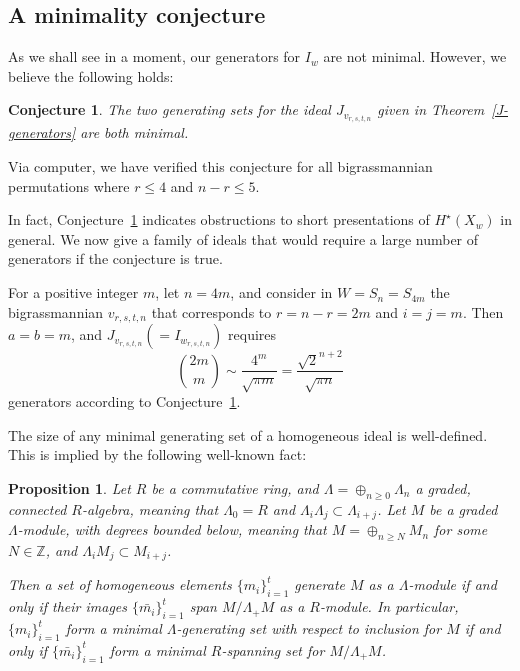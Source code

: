 \documentclass[12pt,dvips]{amsart}
\theoremstyle{plain}
\newtheorem{proposition}[theorem]{Proposition}
\newtheorem{conjecture}[theorem]{Conjecture}
\theoremstyle{definition}
\theoremstyle{remark}
\numberwithin{equation}{section}
\def\ZZ{{\mathbb Z}}
\begin{document}
\subsection{A minimality conjecture}
\label{minconj}
As we shall see in a moment, 
our generators for $I_w$ are not minimal. However,
we believe the following holds:

\begin{conjecture}
\label{minimality-conjecture}
The two generating sets for the ideal $J_{v_{r,s,t,n}}$ given in Theorem~\ref{J-generators}
are both minimal. 
\end{conjecture}

Via computer, we have verified this conjecture for all bigrassmannian permutations
where $r\leq 4$ and $n-r\leq 5$.

In fact, Conjecture~\ref{minimality-conjecture} indicates obstructions to short presentations of
$H^{\star}(X_w)$ in general. We now give 
a family of ideals that would require a large number of generators if the conjecture is true.

For a positive integer $m$, let $n=4m$, and consider in
$W=S_n=S_{4m}$ the bigrassmannian $v_{r,s,t,n}$ that corresponds
to $r=n-r=2m$ and $i=j=m$.  Then $a=b=m$, and $J_{v_{r,s,t,n}}(=I_{w_{r,s,t,n}})$ requires 
\begin{equation}
\label{eqn:badlowerbnd}
\binom{2m}{m} \sim \frac{4^m}{\sqrt{\pi m}} = \frac{\sqrt{2}^{n+2}}{\sqrt{\pi n}}
\end{equation}
generators according to Conjecture~\ref{minimality-conjecture}. 

The size of any minimal generating set of a homogeneous ideal is
well-defined. This is implied by the following well-known fact:

\begin{proposition} 
\label{prop:commalgfact}
Let $R$ be a commutative ring, and $\Lambda=\oplus_{n \geq 0}
\Lambda_n$ a graded, connected $R$-algebra, meaning that $\Lambda_0
=R$ and $\Lambda_i \Lambda_j \subset \Lambda_{i+j}$.  Let $M$ be a
graded $\Lambda$-module, with degrees bounded below, meaning that
$M=\oplus_{n \geq N} M_n$ for some $N \in \ZZ$, and $\Lambda_i M_j
\subset M_{i+j}$.

Then a set of homogeneous elements $\{m_i\}_{i=1}^t$ generate $M$ as a $\Lambda$-module
if and only if their images $\{\bar{m_i}\}_{i=1}^t$ span $M/\Lambda_+ M$ as a $R$-module.
In particular, $\{m_i\}_{i=1}^t$ form a minimal $\Lambda$-generating set with respect to
inclusion for $M$ if and only if $\{\bar{m_i}\}_{i=1}^t$ form a minimal $R$-spanning
set for $M/\Lambda_+ M$.  
\end{proposition}
\end{document}
